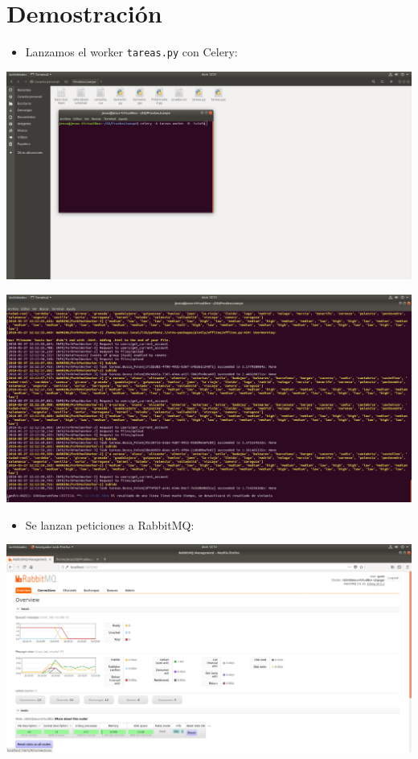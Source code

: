 \documentclass[12pt,letterpaper]{article}
\begin{document}
\section{Demostración}
\begin{itemize}
	\item Lanzamos el worker \texttt{tareas.py} con Celery:
\end{itemize}
\begin{center}
	\includegraphics[scale=0.24]{1.png}
\end{center}
\begin{center}
	\includegraphics[scale=0.24]{2.png}
\end{center}

\newpage
\begin{itemize}
	\item Se lanzan peticiones a RabbitMQ:
\end{itemize}
\begin{center}
	\includegraphics[scale=0.24]{3.png}
\end{center}
\end{document}
